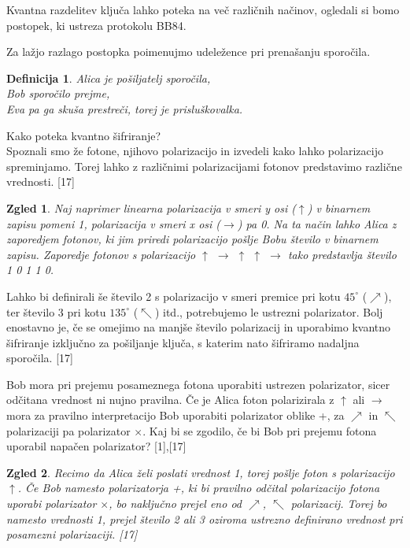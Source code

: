\documentclass[A4paper, 11pt]{article}
\newtheorem{definicija}{Definicija}
\newtheorem{zgled}{Zgled}
\begin{document}
Kvantna razdelitev ključa lahko poteka na več različnih načinov, ogledali si bomo postopek, ki ustreza protokolu BB84.

Za lažjo razlago postopka poimenujmo udeležence pri prenašanju sporočila.
\begin{definicija}
Alica je pošiljatelj sporočila,\\
Bob sporočilo prejme,\\
Eva pa ga skuša prestreči, torej je prisluškovalka.
\end{definicija}

Kako poteka kvantno šifriranje?\\
Spoznali smo že fotone, njihovo polarizacijo in izvedeli kako lahko polarizacijo spreminjamo. Torej lahko z različnimi polarizacijami fotonov predstavimo različne vrednosti. [17]

\begin{zgled}
Naj naprimer linearna polarizacija v smeri y osi ($\uparrow$) v binarnem zapisu pomeni 1, polarizacija v smeri x osi ($\rightarrow$) pa 0. Na ta način lahko Alica z zaporedjem fotonov, ki jim priredi polarizacijo pošlje Bobu število v binarnem zapisu. Zaporedje fotonov s polarizacijo $\uparrow$ $\rightarrow$ $\uparrow$ $\uparrow$ $\rightarrow$ tako predstavlja število 1 0 1 1 0.
\end{zgled}

Lahko bi definirali še število 2 s polarizacijo v smeri premice pri kotu $45^{\circ}$ ($\nearrow$), ter število 3 pri kotu $135^{\circ}$ ($\nwarrow$) itd., potrebujemo le ustrezni polarizator. Bolj enostavno je, če se omejimo na manjše število polarizacij in uporabimo kvantno šifriranje izključno za pošiljanje ključa, s katerim nato šifriramo nadaljna sporočila. [17]

Bob mora pri prejemu posameznega fotona uporabiti ustrezen polarizator, sicer odčitana vrednost ni nujno pravilna. Če je Alica foton polarizirala z $\uparrow$ ali $\rightarrow$ mora za pravilno interpretacijo Bob uporabiti polarizator oblike +, za $\nearrow$ in $\nwarrow$ polarizaciji pa polarizator $\times$. Kaj bi se zgodilo, če bi Bob pri prejemu fotona uporabil napačen polarizator? [1],[17]

\begin{zgled}
Recimo da Alica želi poslati vrednost 1, torej pošlje foton s polarizacijo $\uparrow$. Če Bob namesto polarizatorja +, ki bi pravilno odčital polarizacijo fotona uporabi polarizator $\times$, bo naključno prejel eno od $\nearrow$, $\nwarrow$ polarizacij. Torej bo namesto vrednosti 1, prejel število 2 ali 3 oziroma ustrezno definirano vrednost pri posamezni polarizaciji.  [17]
\end{zgled}
\end{document}
